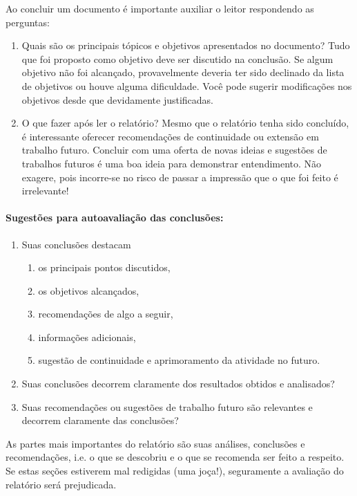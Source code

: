 Ao concluir um documento é importante auxiliar o leitor respondendo as perguntas:
\begin{enumerate}
	\item Quais são os principais tópicos e objetivos apresentados no documento? Tudo que foi proposto como objetivo deve ser discutido na conclusão. Se algum objetivo não foi alcançado, provavelmente deveria ter sido declinado da lista de objetivos ou houve alguma dificuldade. Você pode sugerir modificações nos objetivos desde que devidamente justificadas.
	\item O que fazer após ler o relatório? Mesmo que o relatório tenha sido concluído, é interessante oferecer recomendações de continuidade ou extensão em trabalho futuro. Concluir com uma oferta de novas ideias e sugestões de trabalhos futuros é uma boa ideia para demonstrar entendimento. Não exagere, pois incorre-se no risco de passar a impressão que o que foi feito é irrelevante!
\end{enumerate}

\paragraph{Sugestões para autoavaliação das conclusões:}
\begin{enumerate}
	\item Suas conclusões destacam 
	\begin{enumerate}
			\item os principais pontos discutidos, 
			\item os objetivos alcançados, 
			\item recomendações de algo a seguir, 
			\item informações adicionais, 
			\item sugestão de continuidade e aprimoramento da atividade no futuro.
	\end{enumerate}
	\item Suas conclusões decorrem claramente dos resultados obtidos e analisados?
	\item Suas recomendações ou sugestões de trabalho futuro são relevantes e decorrem claramente das conclusões?
\end{enumerate}

As partes mais importantes do relatório são suas análises, conclusões e recomendações, i.e. o que se descobriu e o que se recomenda ser feito a respeito. Se estas seções estiverem mal redigidas (uma joça!), seguramente a avaliação do relatório será prejudicada.

